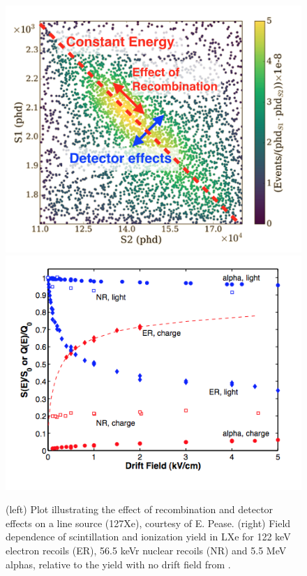 \begin{figure}[htbp]
\begin{center}
\includegraphics[width=\halffig]{figures/lxetpcs/recombination.png}
\includegraphics[width=\halffig]{figures/lxetpcs/yields.png}
\caption{(left) Plot illustrating the effect of recombination and detector effects on a line source (127Xe), courtesy of E. Pease. (right) Field dependence of scintillation and ionization yield in LXe for 122 keV electron recoils (ER), 56.5 keVr nuclear recoils (NR) and 5.5 MeV alphas, relative to the yield with no drift field from \cite{Aprile2010}.}
\label{fig:recombination}
\end{center}
\end{figure}

